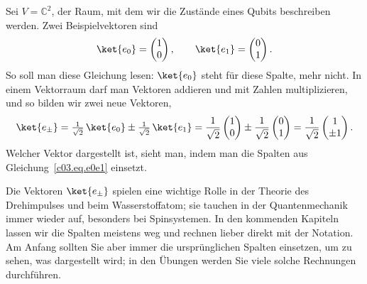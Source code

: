 \begin{example}\label{c03.ex.kets}
  Sei $V = \mathbb{C}^2$, der Raum, mit dem wir die Zustände eines Qubits beschreiben werden.
  Zwei Beispielvektoren sind
  \begin{equation}\label{c03.eq.e0e1}
    \ket{e_0} = \begin{pmatrix} 1 \\ 0 \end{pmatrix},
    \qquad
    \ket{e_1} = \begin{pmatrix} 0 \\ 1 \end{pmatrix} .
  \end{equation}
  So soll man diese Gleichung lesen: $\ket{e_0}$ steht für diese Spalte, mehr nicht. In einem
  Vektorraum darf man Vektoren addieren und mit Zahlen multiplizieren, und so bilden wir zwei
  neue Vektoren,
  \begin{equation}\label{c03.eq.epm}
    \ket{e_\pm} = \tfrac{1}{\sqrt{2}}\, \ket{e_0} \pm \tfrac{1}{\sqrt{2}}\, \ket{e_1}
    = \frac{1}{\sqrt{2}} \begin{pmatrix} 1 \\ 0 \end{pmatrix} \pm \frac{1}{\sqrt{2}} \begin{pmatrix} 0 \\ 1 \end{pmatrix}
    = \frac{1}{\sqrt{2}} \begin{pmatrix} 1 \\ \pm 1 \end{pmatrix} .
  \end{equation}
  Welcher Vektor dargestellt ist, sieht man, indem man die Spalten aus
  Gleichung~\eqref{c03.eq.e0e1} einsetzt.
\end{example}

Die Vektoren $\ket{e_\pm}$ spielen eine wichtige Rolle in der Theorie des Drehimpulses und beim
Wasserstoffatom; sie tauchen in der Quantenmechanik immer wieder auf, besonders bei
Spinsystemen. In den kommenden Kapiteln lassen wir die Spalten meistens weg und rechnen lieber direkt mit
der Notation. Am Anfang sollten Sie aber immer die ursprünglichen Spalten einsetzen, um zu
sehen, was dargestellt wird; in den Übungen werden Sie viele solche Rechnungen durchführen.

